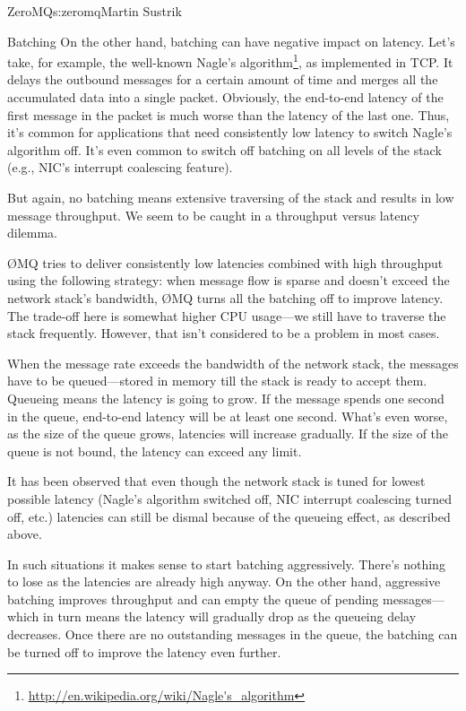 \begin{aosachapter}{ZeroMQ}{s:zeromq}{Martin Sustrik}
\begin{aosasect1}{Batching}
On the other hand, batching can have negative impact on latency. Let's
take, for example, the well-known Nagle's
algorithm\footnote{\url{http://en.wikipedia.org/wiki/Nagle's_algorithm}},
as implemented in TCP. It delays the outbound messages for a certain
amount of time and merges all the accumulated data into a single
packet. Obviously, the end-to-end latency of the first message in the
packet is much worse than the latency of the last one. Thus, it's
common for applications that need consistently low latency to switch
Nagle's algorithm off. It's even common to switch off batching on
all levels of the stack (e.g., NIC's interrupt coalescing feature).

But again, no batching means extensive traversing of the stack and
results in low message throughput. We seem to be caught in a throughput
versus latency dilemma.

{\O}MQ tries to deliver consistently low latencies combined with high
throughput using the following strategy: when message flow is sparse and
doesn't exceed the network stack's bandwidth, {\O}MQ turns all the batching
off to improve latency. The trade-off here is somewhat higher CPU
usage---we still have to traverse the stack frequently. However, that
isn't considered to be a problem in most cases.

When the message rate exceeds the bandwidth of the network stack, the
messages have to be queued---stored in memory till the stack is ready
to accept them. Queueing means the latency is going to grow. If the
message spends one second in the queue, end-to-end latency will be at
least one second. What's even worse, as the size of the queue grows,
latencies will increase gradually. If the size of the queue is not
bound, the latency can exceed any limit.

It has been observed that even though the network stack is tuned for
lowest possible latency (Nagle's algorithm switched off, NIC interrupt
coalescing turned off, etc.) latencies can still be dismal because of
the queueing effect, as described above.

In such situations it makes sense to start batching
aggressively. There's nothing to lose as the latencies are already
high anyway. On the other hand, aggressive batching improves
throughput and can empty the queue of pending messages---which in
turn means the latency will gradually drop as the queueing delay
decreases. Once there are no outstanding messages in the queue, the
batching can be turned off to improve the latency even further.


\end{aosasect1}
\end{aosachapter}
